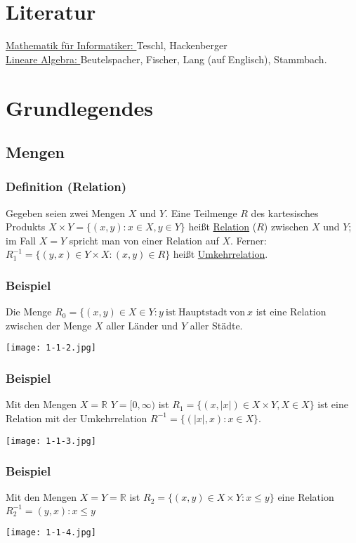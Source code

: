 \hypertarget{contents}{}
\tableofcontents
\pagebreak
{}
\section*{Literatur}
\underline{Mathematik für Informatiker: } Teschl, Hackenberger \\
\underline{Lineare Algebra: } Beutelspacher, Fischer, Lang (auf Englisch), Stammbach.
\section{Grundlegendes}
\subsection{Mengen}
\subsubsection{Definition (Relation)}
Gegeben seien zwei Mengen $X$ und $Y$.  Eine Teilmenge $R$ des kartesisches Produkts $X\times Y=\{(x,y):x\in X, y\in Y\}$ heißt \underline{Relation} ($R$) zwischen $X$ und $Y$; im Fall $X=Y$ spricht man von einer Relation auf $X$.  Ferner: $R^{-1}_1=\{(y,x)\in Y \times X: (x,y)\in R\}$ heißt \underline{Umkehrrelation}.
\subsubsection{Beispiel}
\label{1.1.2}
Die Menge $R_0=\{(x,y)\in X\in Y: y \mathrm{\ ist\ Hauptstadt\ von\ } x$ ist eine Relation zwischen der Menge $X$ aller Länder und $Y$ aller Städte. \\
\begin{center}
\texttt{[image: 1-1-2.jpg]}
\end{center}
\subsubsection{Beispiel}
\label{1.1.3}
Mit den Mengen $X=\mathbb{R}$ $Y=[0,\infty)$ ist $R_1=\{(x,\left| x\right|) \in X\times Y, X\in X\}$ ist eine Relation mit der Umkehrrelation $R^{-1}=\{(\left| x\right|,x):x\in X\}$.\\
\begin{center}
\texttt{[image: 1-1-3.jpg]}
\end{center}
\subsubsection{Beispiel}
\label{1.1.4}
Mit den Mengen $X=Y=\mathbb{R}$ ist $R_2=\{(x,y)\in X\times Y:x \leq y\}$
eine Relation $R^{-1}_{2}={(y,x):x\leq y}$ \\
 \begin{center}
\texttt{[image: 1-1-4.jpg]}
\end{center}
